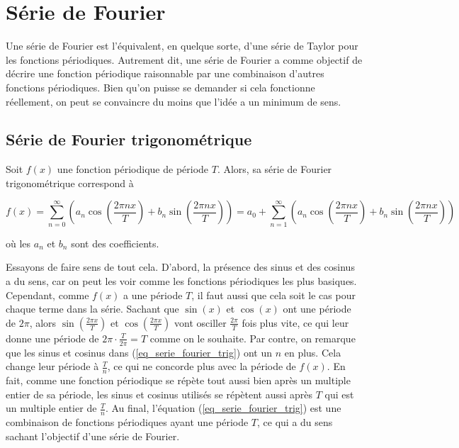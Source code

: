 \newpage
\section{Série de Fourier}
Une série de Fourier est l'équivalent, en quelque sorte, d'une série de Taylor pour les fonctions périodiques. Autrement dit, une série de Fourier a comme objectif de décrire une fonction périodique raisonnable par une combinaison d'autres fonctions périodiques. Bien qu'on puisse se demander si cela fonctionne réellement, on peut se convaincre du moins que l'idée a un minimum de sens.

\subsection{Série de Fourier trigonométrique}
Soit $f(x)$ une fonction périodique de période $T$. Alors, sa série de Fourier trigonométrique correspond à

\begin{equation}
    f(x) = \sum_{n=0}^{\infty}\left(a_n\cos(\frac{2\pi n x}{T}) + b_n\sin(\frac{2\pi n x}{T})\right) = a_0 + \sum_{n=1}^{\infty}\left(a_n\cos(\frac{2\pi n x}{T}) + b_n\sin(\frac{2\pi n x}{T})\right)
    \label{eq_serie_fourier_trig}
\end{equation}

où les $a_n$ et $b_n$ sont des coefficients.

Essayons de faire sens de tout cela. D'abord, la présence des sinus et des cosinus a du sens, car on peut les voir comme les fonctions périodiques les plus basiques. Cependant, comme $f(x)$ a une période $T$, il faut aussi que cela soit le cas pour chaque terme dans la série. Sachant que $\sin(x)$ et $\cos(x)$ ont une période de $2\pi$, alors $\sin(\frac{2\pi x}{T})$ et $\cos(\frac{2\pi x}{T})$ vont osciller $\frac{2\pi}{T}$ fois plus vite, ce qui leur donne une période de $2\pi \cdot \frac{T}{2\pi} = T$ comme on le souhaite. Par contre, on remarque que les sinus et cosinus dans (\ref{eq_serie_fourier_trig}) ont un $n$ en plus. Cela change leur période à $\frac{T}{n}$, ce qui ne concorde plus avec la période de $f(x)$. En fait, comme une fonction périodique se répète tout aussi bien après un multiple entier de sa période, les sinus et cosinus utilisés se répètent aussi après $T$ qui est un multiple entier de $\frac{T}{n}$. Au final, l'équation (\ref{eq_serie_fourier_trig}) est une combinaison de fonctions périodiques ayant une période $T$, ce qui a du sens sachant l'objectif d'une série de Fourier.

